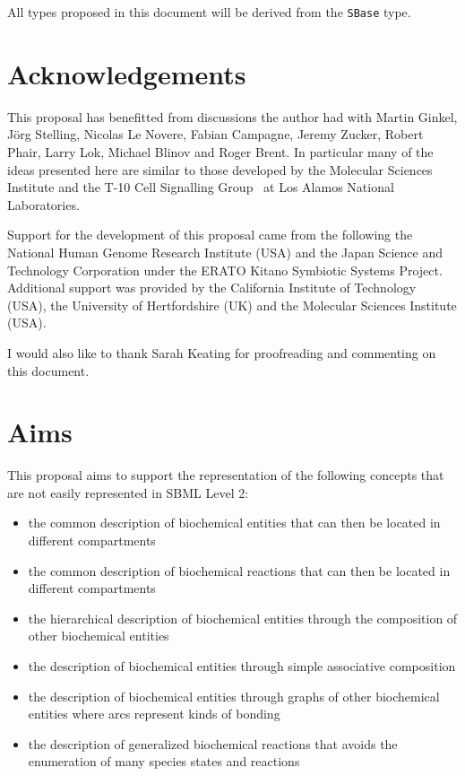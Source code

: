 \documentclass{cekarticle}
\begin{document}
All types proposed in this document will be derived from the
\texttt{SBase} type.


\section{Acknowledgements}

This proposal has benefitted from discussions the author had with
Martin Ginkel, J\"org Stelling, Nicolas Le Novere, Fabian
Campagne, Jeremy Zucker, Robert Phair, Larry Lok, Michael Blinov
and Roger Brent. In particular many of the ideas presented here
are similar to those developed by the Molecular Sciences Institute
and the T-10 Cell Signalling Group~\citep{goldstein:2001} at Los
Alamos National Laboratories.

Support for the development of this proposal came from the
following the National Human Genome Research Institute (USA) and
the Japan Science and Technology Corporation under the ERATO
Kitano Symbiotic Systems Project. Additional support was provided
by the California Institute of Technology (USA), the University of
Hertfordshire (UK) and the Molecular Sciences Institute (USA).

I would also like to thank Sarah Keating for proofreading and
commenting on this document.

\section{Aims}

This proposal aims to support the representation of the following concepts that are not easily
represented in SBML Level 2:

\begin{itemize}
\item the common description of biochemical entities that can then be located in different
compartments
\item the common description of biochemical reactions that can then be located in different
compartments
\item the hierarchical description of biochemical entities through the composition of other
biochemical entities
\item the description of biochemical entities through simple associative composition
\item the description of biochemical entities through graphs of other biochemical entities
where arcs represent kinds of bonding
\item the description of generalized biochemical reactions that avoids the enumeration of
many species states and reactions
\end{itemize}
\end{document}
